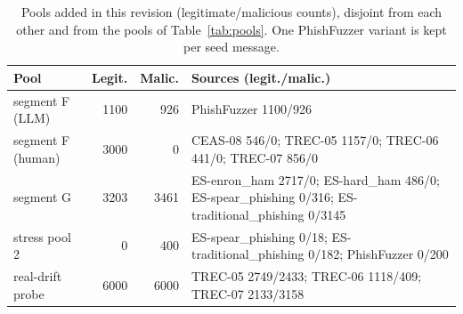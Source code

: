 \begin{table}[t]
\centering
\caption{Pools added in this revision (legitimate/malicious counts), disjoint from each other and from the pools of Table~\ref{tab:pools}. One PhishFuzzer variant is kept per seed message.}
\label{tab:rev-pools}
\scriptsize
\setlength{\tabcolsep}{3pt}
\begin{tabular}{@{}lrrp{8.5cm}@{}}
\toprule
Pool & Legit. & Malic. & Sources (legit./malic.) \\
\midrule
segment F (LLM) & 1100 & 926 & PhishFuzzer 1100/926 \\
segment F (human) & 3000 & 0 & CEAS-08 546/0; TREC-05 1157/0; TREC-06 441/0; TREC-07 856/0 \\
segment G & 3203 & 3461 & ES-enron\_ham 2717/0; ES-hard\_ham 486/0; ES-spear\_phishing 0/316; ES-traditional\_phishing 0/3145 \\
stress pool 2 & 0 & 400 & ES-spear\_phishing 0/18; ES-traditional\_phishing 0/182; PhishFuzzer 0/200 \\
real-drift probe & 6000 & 6000 & TREC-05 2749/2433; TREC-06 1118/409; TREC-07 2133/3158 \\
\bottomrule
\end{tabular}
\end{table}
